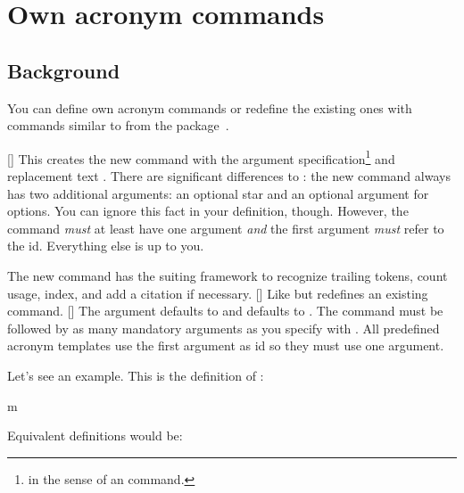 \documentclass{acro-manual}
\begin{document}
\section{Own acronym commands}\label{sec:own-acronym-commands}
\subsection{Background}
You can define own acronym commands or redefine the existing ones with
commands similar to  from the 
package~\cite{pkg:xparse}.
\begin{commands}
  []
    This creates the new command  with the argument
    specification\footnote{in the sense of an 
      command.}  and replacement text .
    There are significant differences to : the new
    command always has two additional arguments: an optional star and an
    optional argument for options.  You can ignore this fact in your
    definition, though.  However, the command \emph{must} at least have one
    argument \emph{and} the first argument \emph{must} refer to the \ac{id}.
    Everything else is up to you. \par
    The new command has the suiting framework to recognize trailing tokens,
    count usage, index, and add a citation if necessary.
  []
    Like  but redefines an existing command.
  []
    The argument  defaults to  and  defaults to .  The command must be followed by as many
    mandatory arguments as you specify with .  All
    predefined acronym templates use the first argument as \ac{id} so they
    must use one argument.
\end{commands}
Let's see an example. This is the definition of :
\begin{sourcecode}
  \NewAcroCommand\ac{m}{}
\end{sourcecode}
Equivalent definitions would be:
\end{document}
